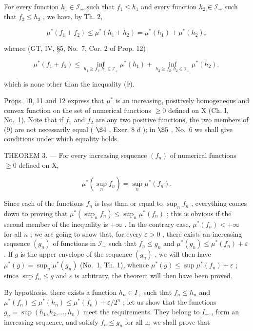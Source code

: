 For every function \(h_1 \in \mathcal{I}_+\) such that \(f_1 \leqslant h_1\) and every function \(h_2 \in \mathcal{I}_+\) such that \(f_2 \leqslant h_2\) , we have, by Th. 2,

\[
\mu^ {*} (f _ {1} + f _ {2}) \leqslant \mu^ {*} (h _ {1} + h _ {2}) = \mu^ {*} (h _ {1}) + \mu^ {*} (h _ {2}),
\]

whence (GT, IV, §5, No.~7, Cor. 2 of Prop. 12)

\[
\mu^ {*} (f _ {1} + f _ {2}) \leqslant \inf _ {h _ {1} \geqslant f _ {1}, h _ {1} \in \mathcal {I} _ {+}} \mu^ {*} (h _ {1}) + \inf _ {h _ {2} \geqslant f _ {2}, h _ {2} \in \mathcal {I} _ {+}} \mu^ {*} (h _ {2}),
\]

which is none other than the inequality (9).

Props. 10, 11 and 12 express that \(\mu^{*}\) is an increasing, positively homogeneous and convex function on the set of numerical functions \(\geqslant 0\) defined on X (Ch. I, No.~1). Note that if \(f_{1}\) and \(f_{2}\) are any two positive functions, the two members of (9) are not necessarily equal ( \(\S 4\) , Exer. 8 \(d\) ); in \(\S 5\) , No.~6 we shall give conditions under which equality holds.

THEOREM 3. --- For every increasing sequence \((f_{n})\) of numerical functions \(\geqslant 0\) defined on X,

\[
\mu^ {*} \left(\sup _ {n} f _ {n}\right) = \sup _ {n} \mu^ {*} (f _ {n}).\tag{10}
\]

Since each of the functions \(f_n\) is less than or equal to \(\sup_{n} f_n\) , everything comes down to proving that \(\mu^*(\sup_{n} f_n) \leqslant \sup_{n} \mu^*(f_n)\) ; this is obvious if the second member of the inequality is \(+\infty\) . In the contrary case, \(\mu^*(f_n) < +\infty\) for all \(n\) ; we are going to show that, for every \(\varepsilon > 0\) , there exists an increasing sequence \((g_n)\) of functions in \(\mathcal{I}_+\) such that \(f_n \leqslant g_n\) and \(\mu^*(g_n) \leqslant \mu^*(f_n) + \varepsilon\) . If \(g\) is the upper envelope of the sequence \((g_n)\) , we will then have \(\mu^*(g) = \sup_n \mu^*(g_n)\) (No.~1, Th. 1), whence \(\mu^*(g) \leqslant \sup \mu^*(f_n) + \varepsilon\) ; since \(\sup f_n \leqslant g\) and \(\varepsilon\) is arbitrary, the theorem will then have been proved.

By hypothesis, there exists a function \(h_{n} \in I_{+}\) such that \(f_{n} \leqslant h_{n}\) and \(\mu^{*}(f_{n}) \leqslant \mu^{*}(h_{n}) \leqslant \mu^{*}(f_{n}) + \varepsilon/2^{n}\) ; let us show that the functions \(g_{n} = \sup(h_{1}, h_{2}, \ldots, h_{n})\) meet the requirements. They belong to \(I_{+}\) , form an increasing sequence, and satisfy \(f_{n} \leqslant g_{n}\) for all n; we shall prove that

